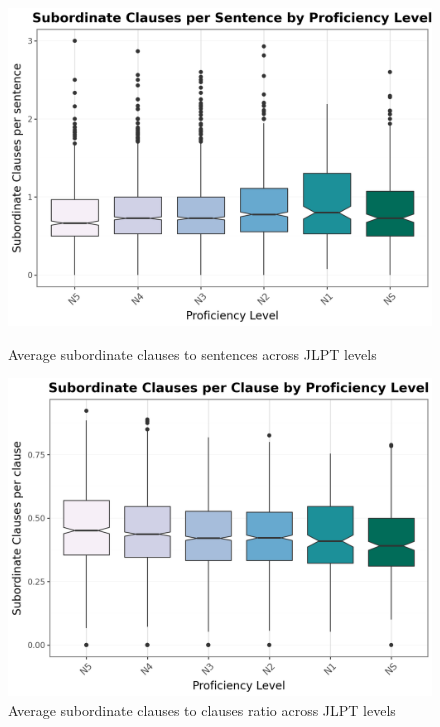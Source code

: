 \begin{figure}[htbp]
    \centering
    \begin{minipage}{.48\textwidth}
        \centering
    \includegraphics[scale=.3]{img/SCperS}
    \caption[Average subordinate clauses to sentences across JLPT levels]{Average subordinate clauses to sentences across JLPT levels}
        \label{fig:SubclperS}
    \end{minipage}
    \hfill
\begin{minipage}{.48\textwidth}
        \centering
        \includegraphics[scale=.3]{img/SCperC}
        \caption[Average subordinate clauses to clauses ratio across JLPT levels]{Average subordinate clauses to clauses ratio across JLPT levels}
\label{fig:SCperC}
\end{minipage}
    \end{figure}

